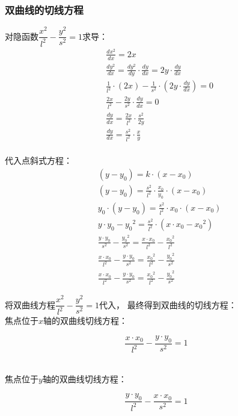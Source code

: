 \documentclass[UTF8]{ctexart}
\begin{document}
\subsubsection{双曲线的切线方程}
    对隐函数$\dfrac{x^2}{l^2}-\dfrac{y^2}{s^2}=1$求导：
    \setcounter{equation}{0}
    \begin{align}
        &\frac{dx^2}{dx}=2x\\[4mm]
        &\frac{dy^2}{dx}=\frac{dy^2}{dy}\cdot\frac{dy}{dx}=2y\cdot\frac{dy}{dx}\\[6mm]
        &\frac{1}{l^2}\cdot(2x)-\frac{1}{s^2}\cdot(2y\cdot\frac{dy}{dx})=0\\[5mm]
        &\frac{2x}{l^2}-\frac{2y}{s^2}\cdot\frac{dy}{dx}=0\\[4mm]
        &\frac{dy}{dx}=\frac{2x}{l^2}\cdot\frac{s^2}{2y}\\[4mm]
        &\frac{dy}{dx}=\frac{s^2}{l^2}\cdot\frac{x}{y}
    \end{align}\\
    代入点斜式方程：
    \begin{align}
        &(y-y_0)=k\cdot(x-x_0)\\[4mm]
        &(y-y_0)=\frac{s^2}{l^2}\cdot\frac{x_0}{y_0}\cdot(x-x_0)\\[4mm]
        &y_0\cdot(y-y_0)=\frac{s^2}{l^2}\cdot x_0\cdot(x-x_0)\\[4mm]
        &y\cdot y_0-{y_0}^2=\frac{s^2}{l^2}\cdot(x\cdot x_0-{x_0}^2)\\[4mm]
        &\frac{y\cdot y_0}{s^2}-\frac{{y_0}^2}{s^2}=\frac{x\cdot x_0}{l^2}-\frac{{x_0}^2}{l^2}\\[6mm]
        &\frac{x\cdot x_0}{l^2}-\frac{y\cdot y_0}{s^2}=\frac{{x_0}^2}{l^2}-\frac{{y_0}^2}{s^2}\\[6mm]
        &\frac{x\cdot x_0}{l^2}-\frac{y\cdot y_0}{s^2}=\frac{{x_0}^2}{l^2}-\frac{{y_0}^2}{s^2}
    \end{align}

\newpage

    将双曲线方程$\dfrac{x^2}{l^2}-\dfrac{y^2}{s^2}=1$代入，
    最终得到双曲线的切线方程：\\[4mm]
    焦点位于$x$轴的双曲线切线方程：
    \begin{large}
        \begin{equation*}
            \frac{x \cdot x_0}{l^2}-\frac{y \cdot y_0}{s^2}=1
        \end{equation*}
    \end{large}\\
    焦点位于$y$轴的双曲线切线方程：
    \begin{large}
        \begin{equation*}
            \frac{y \cdot y_0}{l^2}-\frac{x \cdot x_0}{s^2}=1
        \end{equation*}
    \end{large}\\
\end{document}
